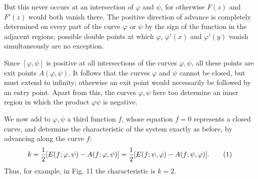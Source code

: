 \documentclass[11pt]{article}
\begin{document}
But this never occurs at an intersection of $\varphi$ and $\psi$, for otherwise $F(z)$ and $F'(z)$ would both vanish there. The positive direction of advance is completely determined on every part of the curve $\varphi$ or $\psi$ by the sign of the function in the adjacent regions; possible double points at which $\varphi$, $\varphi'(x)$ and $\varphi'(y)$ vanish simultaneously are no exception.

Since $[\varphi,\psi]$ is positive at all intersections of the curves $\varphi,\psi$, all these points are exit points $A(\varphi,\psi)$. It follows that the curves $\varphi$ and $\psi$ cannot be closed, but must extend to infinity; otherwise an exit point would necessarily be followed by an entry point. Apart from this, the curves $\varphi,\psi$ here too determine an inner region in which the product $\varphi\psi$ is negative.

We now add to $\varphi,\psi$ a third function $f$, whose equation $f=0$ represents a closed curve, and determine the characteristic of the system exactly as before, by advancing along the curve $f$:
\begin{equation}
 k={1\over2}[E(f;\varphi,\psi)-A(f;\varphi,\psi)]
  ={1\over2}[E(f;\psi,\varphi)-A(f;\psi,\varphi)].
\tag{1}
\end{equation}
Thus, for example, in Fig. 11 the characteristic is $k=2$.
\end{document}
